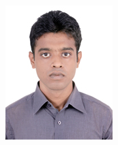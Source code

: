 \documentclass[10pt]{article} %
\begin{document}
{\begin{minipage}[t]{0.5\textwidth}
\end{minipage} %
\hfill
\begin{minipage}[t]{0.44\textwidth} %
\vspace{0pt} %


\begin{minipage}[t]{0.3\textwidth}
{\raggedleft\begin{figure}[H]
	\includegraphics[width=\textwidth]{pic.jpg}
\end{figure}}
\end{minipage} %


\end{minipage}}
\end{document}
